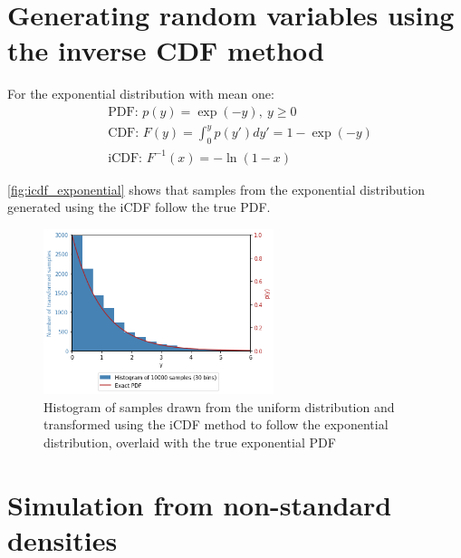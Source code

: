 \documentclass[a4paper]{article}
\begin{document}

\section{Generating random variables using the inverse CDF method}

For the exponential distribution with mean one:
\begin{align*}
    & \text{PDF: } p(y) = \exp(-y), \ y \geq 0 \\
    & \text{CDF: } F(y) = \int_0^y p(y') dy' = 1 - \exp(-y) \\
    & \text{iCDF: } F^{-1}(x) = -\ln(1 - x)
\end{align*}

\autoref{fig:icdf_exponential} shows that samples from the exponential distribution generated using the iCDF follow the
true PDF.

\begin{figure}[h]
\centering
\includegraphics[width=0.6\textwidth]{figures/icdf_exponential.png}
\caption{Histogram of samples drawn from the uniform distribution and transformed using the iCDF method to follow the
exponential distribution, overlaid with the true exponential PDF}
\label{fig:icdf_exponential}
\end{figure}



\section{Simulation from non-standard densities}
\end{document}
